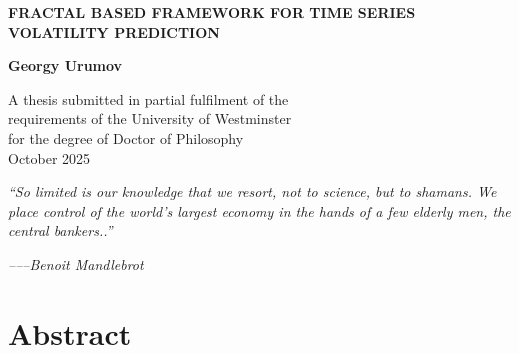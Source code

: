\documentclass[12pt,a4paper]{report}
\author{}
\date{}
\numberwithin{equation}{section}
\begin{document}
\onehalfspacing

\begin{titlepage}
\centering
\vspace*{2cm}
{\Large\bfseries FRACTAL BASED FRAMEWORK FOR TIME SERIES VOLATILITY PREDICTION\par}
\vspace{2cm}
{\Large\bfseries Georgy Urumov\par}
\vfill
A thesis submitted in partial fulfilment of the\\
requirements of the University of Westminster\\
for the degree of Doctor of Philosophy\\
\vspace{1.5cm}
October 2025
\end{titlepage}

\clearpage
{}
\setcounter{page}{1}



\emph{\hfill\break
}

\emph{``So limited is our knowledge that we resort, not to science, but
to shamans. We place control of the world's largest economy in the hands
of a few elderly men, the central bankers..''}

\emph{--\/--\/--Benoit Mandlebrot}

\hypertarget{abstract}{%
\chapter*{Abstract}\label{abstract}
}
\end{document}

